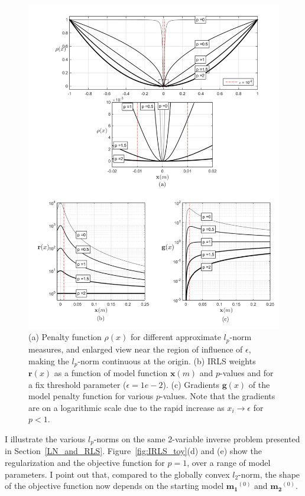 \begin{figure}[h!]
\includegraphics[scale=0.53]{Lp_r_dphidm}
\centering
\caption{(a) Penalty function $\rho(x)$ for different approximate $l_p$-norm measures, and enlarged view near the region of influence of $\epsilon$, making the $l_p$-norm continuous at the origin. (b) IRLS weights $\mathbf{r}(x)$ as a function of model function $\mathbf{x}(m)$ and $p$-values and for a fix threshold parameter ($\epsilon =1e-2$). (c)  Gradients $\mathbf{g}(x)$ of the model penalty function for various $p$-values. Note that the gradients are on a logarithmic scale due to the rapid increase as ${x}_i \rightarrow \epsilon$ for $p < 1$.}
\label{fig:Lp_r_dphidm}
\end{figure}

I illustrate the various $l_p$-norms on the same 2-variable inverse problem presented in Section~\ref{LN_and_RLS}.
Figure~\ref{fig:IRLS_toy}(d) and (e) show the regularization and the objective function for $p=1$, over a range of model parameters.
I point out that, compared to the globally convex $l_2$-norm, the shape of the objective function now depends on the starting model $\mathbf{m_1}^{(0)}$ and $\mathbf{m_2}^{(0)}$.

